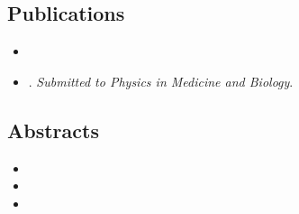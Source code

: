 \documentclass[\relativeRoot/main.tex]{subfiles}
\begin{document}
\subsection*{Publications}
\begin{itemize}
    \item {}
    \item {}. \emph{Submitted to Physics in Medicine and Biology}.
\end{itemize}

\subsection*{Abstracts}
\begin{itemize}
    \item {}
    \item {}
    \item {}
\end{itemize}

\tableofcontents
\end{document}
